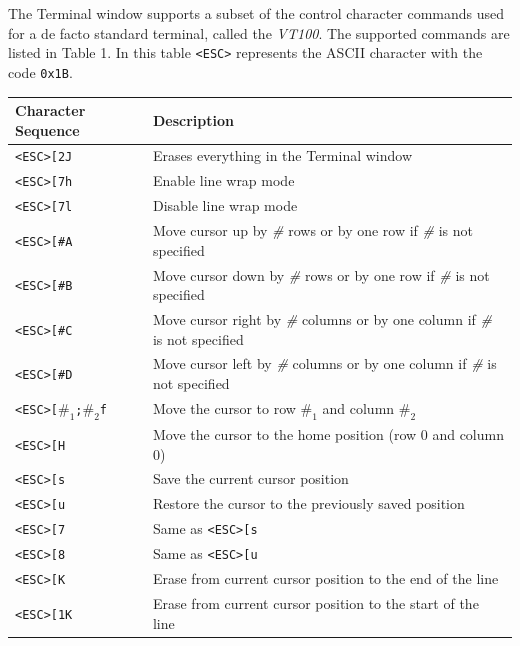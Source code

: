 \documentclass[11pt, twoside, pdftex]{article}
\begin{document}
The Terminal window supports a subset of the control character
commands used for a de facto standard terminal, called 
the {\it VT100}.
The supported commands are listed in Table 1.
In this table \texttt{<ESC>} represents the ASCII character 
with the code \texttt{0x1B}.

\begin{table}[H]
    \centering
    \begin{tabular}{|l|p{4in}|}
        \hline
        Character Sequence&Description\\
        \hline
        \hline
        \texttt{<ESC>[2J}&Erases everything in the Terminal window\\
        \hline
        \texttt{<ESC>[7h}&Enable line wrap mode\\
        \hline
        \texttt{<ESC>[7l}&Disable line wrap mode\\
        \hline
        \texttt{<ESC>[\emph{\#}A}&Move cursor up by \emph{\#} rows or by one row if \emph{\#} is not specified\\
        \hline
        \texttt{<ESC>[\emph{\#}B}&Move cursor down by \emph{\#} rows or by one row if \emph{\#} is not specified\\
        \hline
        \texttt{<ESC>[\emph{\#}C}&Move cursor right by \emph{\#} columns or by one column if \emph{\#} is not specified\\
        \hline
        \texttt{<ESC>[\emph{\#}D}&Move cursor left by \emph{\#} columns or by one column if \emph{\#} is not specified\\
        \hline
        \texttt{<ESC>[\emph{$\#_1$};\emph{$\#_2$}f}&Move the cursor to row \emph{$\#_1$} and column \emph{$\#_2$}\\
        \hline
        \texttt{<ESC>[H}&Move the cursor to the home position (row 0 and column 0)\\
        \hline
        \texttt{<ESC>[s}&Save the current cursor position\\
        \hline
        \texttt{<ESC>[u}&Restore the cursor to the previously saved position\\
        \hline
        \texttt{<ESC>[7}&Same as \texttt{<ESC>[s}\\
        \hline
        \texttt{<ESC>[8}&Same as \texttt{<ESC>[u}\\
        \hline
        \texttt{<ESC>[K}&Erase from current cursor position to the end of the line\\
        \hline
        \texttt{<ESC>[1K}&Erase from current cursor position to the start of the line\\

\end{tabular}
\end{table}
\end{document}
